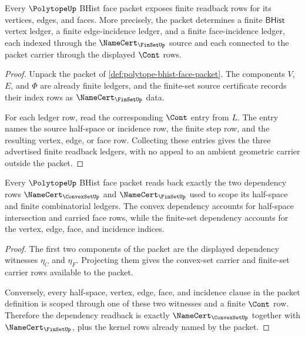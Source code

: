 \begin{theorem}
\label{thm:polytope-vertex-edge-ledger-readback}
Every $\PolytopeUp$ BHist face packet exposes finite readback rows for its
vertices, edges, and faces. More precisely, the packet determines a finite
$\mathsf{BHist}$ vertex ledger, a finite edge-incidence ledger, and a finite
face-incidence ledger, each indexed through the $\NameCert_{\FinSetUp}$ source
and each connected to the packet carrier through the displayed $\Cont$ rows.
\end{theorem}
\begin{proof}
Unpack the packet of \autoref{def:polytope-bhist-face-packet}. The components
$V$, $E$, and $\Phi$ are already finite ledgers, and the finite-set source
certificate records their index rows as $\NameCert_{\FinSetUp}$ data.

For each ledger row, read the corresponding $\Cont$ entry from $L$. The entry
names the source half-space or incidence row, the finite step row, and the
resulting vertex, edge, or face row. Collecting these entries gives the three
advertised finite readback ledgers, with no appeal to an ambient geometric
carrier outside the packet.
\end{proof}

\begin{theorem}
\label{thm:polytope-convex-finset-dependency-readback}
Every $\PolytopeUp$ BHist face packet reads back exactly the two dependency
rows $\NameCert_{\ConvexSetUp}$ and $\NameCert_{\FinSetUp}$ used to scope its
half-space and finite combinatorial ledgers. The convex dependency accounts for
half-space intersection and carried face rows, while the finite-set dependency
accounts for the vertex, edge, face, and incidence indices.
\end{theorem}
\begin{proof}
The first two components of the packet are the displayed dependency witnesses
$\eta_C$ and $\eta_F$. Projecting them gives the convex-set carrier and
finite-set carrier rows available to the packet.

Conversely, every half-space, vertex, edge, face, and incidence clause in the
packet definition is scoped through one of these two witnesses and a finite
$\Cont$ row. Therefore the dependency readback is exactly
$\NameCert_{\ConvexSetUp}$ together with $\NameCert_{\FinSetUp}$, plus the
kernel rows already named by the packet.
\end{proof}

